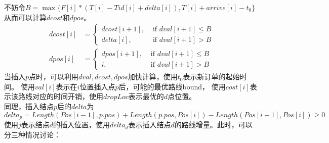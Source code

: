 \documentclass[hyperref,UTF8]{ctexart}
\theoremstyle{definition}
\theoremstyle{remark}
\numberwithin{equation}{subsection}
\begin{document}
不妨令$B = \max\{F[i]*(T[i]-Tid[i]+delta[i]), T[i]+arrive[i]-t_0\}$
从而可以计算$dcost$和$dpos$。
\begin{align*}
	dcost[i] &= \left\{
		\begin{aligned}
			dcost[i+1], &\text{ if } dval[i+1] \le B \\
			delta[i], &\text{ if }	dval[i+1] > B
		\end{aligned}
	\right . \\
	dpos[i] &= \left\{
		\begin{aligned}
			dpos[i+1], &\text{ if } dval[i+1] \le B \\
			i, &\text{ if }	dval[i+1] > B
		\end{aligned}
	\right .
\end{align*}
当插入$p$点时，可以利用$dval, dcost, dpos$加快计算，使用$t_0$表示新订单的起始时间。
使用$val[i]$表示在$i$位置插入点$p$后，可能的最优路线bound，
使用$cost[i]$表示该路线对应的时间开销，使用$dropLoc$表示最优的$d$点位置。\\
同理，插入结点$p$后的$delta$为
\[
	delta_p = Length(Pos[i-1], p.pos) + Length(p.pos, Pos[i]) - Length(Pos[i-1], Pos[i]) \ge 0
\]
使用$j$表示结点$d$的插入位置，使用$delta_d$表示插入结点$d$的路线增量。此时，可以分三种情况讨论：
\end{document}
